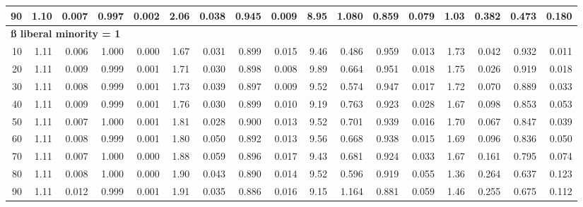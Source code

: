 \documentclass[
]{article}
\begin{document}
\begin{table}[H]
{\begin{tabular}{r|r|r|r|r|r|r|r|r|r|r|r|r|r|r|r|r}
\hline
\hspace{1em}90 & 1.10 & 0.007 & 0.997 & 0.002 & 2.06 & 0.038 & 0.945 & 0.009 & 8.95 & 1.080 & 0.859 & 0.079 & 1.03 & 0.382 & 0.473 & 0.180\\
\hline
\multicolumn{17}{l}{\textbf{ß liberal minority = 1}}\\
\hline
\hspace{1em}10 & 1.11 & 0.006 & 1.000 & 0.000 & 1.67 & 0.031 & 0.899 & 0.015 & 9.46 & 0.486 & 0.959 & 0.013 & 1.73 & 0.042 & 0.932 & 0.011\\
\hline
\hspace{1em}20 & 1.11 & 0.009 & 0.999 & 0.001 & 1.71 & 0.030 & 0.898 & 0.008 & 9.89 & 0.664 & 0.951 & 0.018 & 1.75 & 0.026 & 0.919 & 0.018\\
\hline
\hspace{1em}30 & 1.11 & 0.008 & 0.999 & 0.001 & 1.73 & 0.039 & 0.897 & 0.009 & 9.52 & 0.574 & 0.947 & 0.017 & 1.72 & 0.070 & 0.889 & 0.033\\
\hline
\hspace{1em}40 & 1.11 & 0.009 & 0.999 & 0.001 & 1.76 & 0.030 & 0.899 & 0.010 & 9.19 & 0.763 & 0.923 & 0.028 & 1.67 & 0.098 & 0.853 & 0.053\\
\hline
\hspace{1em}50 & 1.11 & 0.007 & 1.000 & 0.001 & 1.81 & 0.028 & 0.900 & 0.013 & 9.52 & 0.701 & 0.939 & 0.016 & 1.70 & 0.067 & 0.847 & 0.039\\
\hline
\hspace{1em}60 & 1.11 & 0.008 & 0.999 & 0.001 & 1.80 & 0.050 & 0.892 & 0.013 & 9.56 & 0.668 & 0.938 & 0.015 & 1.69 & 0.096 & 0.836 & 0.050\\
\hline
\hspace{1em}70 & 1.11 & 0.007 & 1.000 & 0.000 & 1.88 & 0.059 & 0.896 & 0.017 & 9.43 & 0.681 & 0.924 & 0.033 & 1.67 & 0.161 & 0.795 & 0.074\\
\hline
\hspace{1em}80 & 1.11 & 0.008 & 1.000 & 0.000 & 1.90 & 0.043 & 0.890 & 0.014 & 9.52 & 0.596 & 0.919 & 0.055 & 1.36 & 0.264 & 0.637 & 0.123\\
\hline
\hspace{1em}90 & 1.11 & 0.012 & 0.999 & 0.001 & 1.91 & 0.035 & 0.886 & 0.016 & 9.15 & 1.164 & 0.881 & 0.059 & 1.46 & 0.255 & 0.675 & 0.112\\
\hline
\end{tabular}}\begin{table}
\centering
{}
\end{table}
\end{table}
\end{document}

